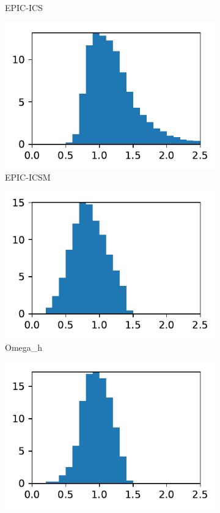 \documentclass[3p,times,procedia,number]{elsarticle}
\begin{document}
\begin{figure}
\begin{subfigure}{.16\textwidth}
\caption{EPIC-ICS}
\end{subfigure}
\begin{subfigure}{.16\textwidth}
\centering
\includegraphics[width=\textwidth]{epic-icsm-cube-cylinder-polar-1-length.pdf}
\caption{EPIC-ICSM}
\end{subfigure}
\begin{subfigure}{.16\textwidth}
\centering
\includegraphics[width=\textwidth]{omega_h-cube-cylinder-polar-1-length.pdf}
\caption{Omega\_h}
\end{subfigure}
\begin{subfigure}{.16\textwidth}
\centering
\includegraphics[width=\textwidth]{pragmatic-cube-cylinder-polar-1-length.pdf}

\end{subfigure}
\end{figure}
\end{document}
